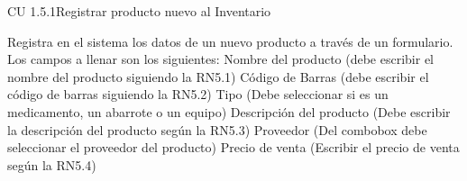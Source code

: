 \begin{UseCase}{CU 1.5.1}{Registrar producto nuevo al Inventario} {
	
	Registra en el sistema los datos de un nuevo producto a través de un formulario. Los campos a llenar son los siguientes:
	\UCli Nombre del producto (debe escribir el nombre del producto siguiendo la RN5.1)
	\UCli Código de Barras (debe escribir el código de barras siguiendo la RN5.2)
	\UCli Tipo (Debe seleccionar si es un medicamento, un abarrote o un equipo)
	\UCli Descripción del producto (Debe escribir la descripción del producto según la RN5.3)
	\UCli Proveedor (Del combobox debe seleccionar el proveedor del producto)
	\UCli Precio de venta (Escribir el precio de venta según la RN5.4)

}
	


	


\end{UseCase}
